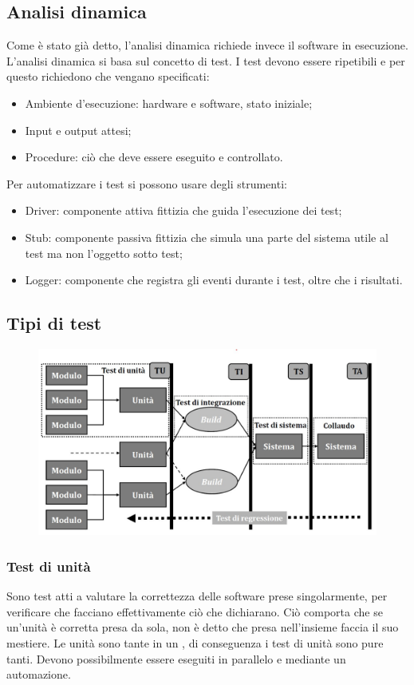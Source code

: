 \documentclass[../main]{subfiles}
\begin{document}
\subsection{Analisi dinamica}
Come è stato già detto, l'analisi dinamica richiede invece il software in esecuzione. L'analisi dinamica si basa sul concetto di test. I test devono essere ripetibili e per questo richiedono che vengano specificati:
\begin{itemize}
    \item Ambiente d'esecuzione: hardware e software, stato iniziale;
    \item Input e output attesi;
    \item Procedure: ciò che deve essere eseguito e controllato.
\end{itemize}
Per automatizzare i test si possono usare degli strumenti:
\begin{itemize}
    \item Driver: componente attiva fittizia che guida l'esecuzione dei test;
    \item Stub: componente passiva fittizia che simula una parte del sistema utile al test ma non l'oggetto sotto test;
    \item Logger: componente che registra gli eventi durante i test, oltre che i risultati.
\end{itemize}
\subsection{Tipi di test}
\begin{figure}[h]
    \begin{center}
        \includegraphics[scale=0.5]{immagini/test.jpg}
    \end{center}
\end{figure}
\subsubsection{Test di unità}
Sono test atti a valutare la correttezza delle  software prese singolarmente, per verificare che facciano effettivamente ciò che dichiarano. Ciò comporta che se un'unità è corretta presa da sola, non è detto che presa nell'insieme faccia il suo mestiere.\newline
Le unità sono tante in un , di conseguenza i test di unità sono pure tanti. Devono possibilmente essere eseguiti in parallelo e mediante un automazione.
\end{document}
